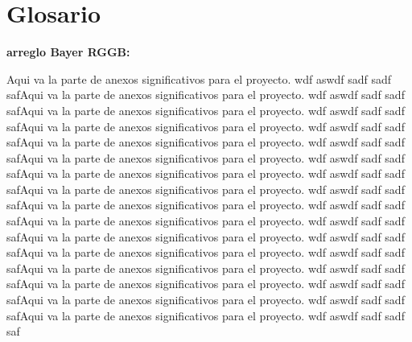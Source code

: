 
\chapter{Glosario} %


\textbf{arreglo Bayer RGGB:} 

Aqui va la parte de anexos significativos para el proyecto. wdf aswdf sadf sadf safAqui va la parte de anexos significativos para el proyecto. wdf aswdf sadf sadf safAqui va la parte de anexos significativos para el proyecto. wdf aswdf sadf sadf safAqui va la parte de anexos significativos para el proyecto. wdf aswdf sadf sadf safAqui va la parte de anexos significativos para el proyecto. wdf aswdf sadf sadf safAqui va la parte de anexos significativos para el proyecto. wdf aswdf sadf sadf safAqui va la parte de anexos significativos para el proyecto. wdf aswdf sadf sadf safAqui va la parte de anexos significativos para el proyecto. wdf aswdf sadf sadf safAqui va la parte de anexos significativos para el proyecto. wdf aswdf sadf sadf safAqui va la parte de anexos significativos para el proyecto. wdf aswdf sadf sadf safAqui va la parte de anexos significativos para el proyecto. wdf aswdf sadf sadf safAqui va la parte de anexos significativos para el proyecto. wdf aswdf sadf sadf safAqui va la parte de anexos significativos para el proyecto. wdf aswdf sadf sadf safAqui va la parte de anexos significativos para el proyecto. wdf aswdf sadf sadf safAqui va la parte de anexos significativos para el proyecto. wdf aswdf sadf sadf safAqui va la parte de anexos significativos para el proyecto. wdf aswdf sadf sadf saf